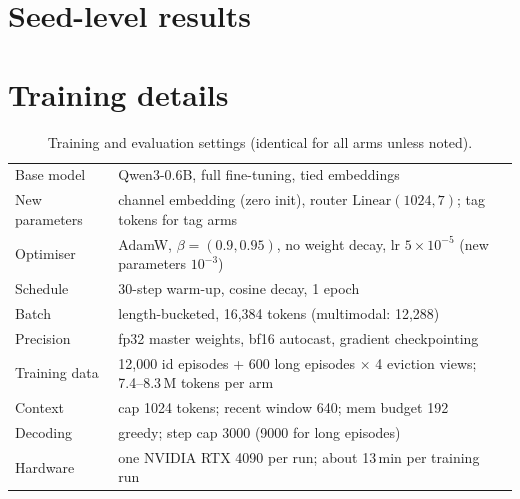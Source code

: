 \documentclass[10pt]{article}
\begin{document}
\section{Seed-level results}\label{app:seeds}
\begin{table}[h]
\centering\small
\caption{Task success per training seed and across seeds (mean, SD and $t$-based 95\% CI over seeds).}
\label{tab:seeds}
\resizebox{\linewidth}{!}{}
\end{table}

\section{Training details}\label{app:train}
\begin{table}[h]
\centering\small
\caption{Training and evaluation settings (identical for all arms unless noted).}
\begin{tabular}{ll}
\toprule
Base model & Qwen3-0.6B, full fine-tuning, tied embeddings \\
New parameters & channel embedding (zero init), router $\mathrm{Linear}(1024,7)$; tag tokens for tag arms \\
Optimiser & AdamW, $\beta=(0.9,0.95)$, no weight decay, lr $5\times10^{-5}$ (new parameters $10^{-3}$) \\
Schedule & 30-step warm-up, cosine decay, 1 epoch \\
Batch & length-bucketed, 16{,}384 tokens (multimodal: 12{,}288) \\
Precision & fp32 master weights, bf16 autocast, gradient checkpointing \\
Training data & 12{,}000 id episodes + 600 long episodes $\times$ 4 eviction views; 7.4--8.3\,M tokens per arm \\
Context & cap 1024 tokens; recent window 640; mem budget 192 \\
Decoding & greedy; step cap 3000 (9000 for long episodes) \\
Hardware & one NVIDIA RTX 4090 per run; about 13\,min per training run \\
\bottomrule
\end{tabular}
\end{table}
\end{document}
